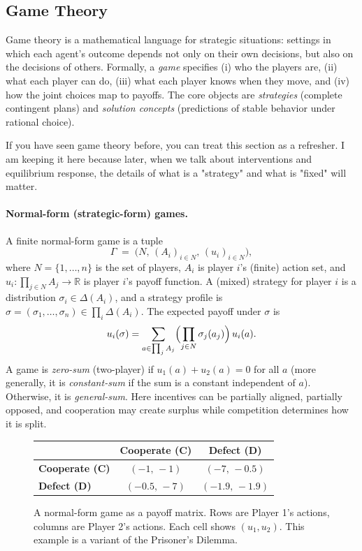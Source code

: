 \documentclass{article}
\begin{document}
\subsection{Game Theory}
Game theory is a mathematical language for strategic situations: settings in which each agent’s outcome depends not only on their own decisions, but also on the decisions of others. Formally, a \emph{game} specifies (i) who the players are, (ii) what each player can do, (iii) what each player knows when they move, and (iv) how the joint choices map to payoffs. The core objects are \emph{strategies} (complete contingent plans) and \emph{solution concepts} (predictions of stable behavior under rational choice).

If you have seen game theory before, you can treat this section as a refresher. I am keeping it here because later, when we talk about interventions and equilibrium response, the details of what is a "strategy" and what is "fixed" will matter.

\paragraph{Normal-form (strategic-form) games.}
A finite normal-form game is a tuple
\[
\Gamma \;=\; \bigl(N,\,(A_i)_{i\in N},\,(u_i)_{i\in N}\bigr),
\]
where \(N=\{1,\dots,n\}\) is the set of players, \(A_i\) is player \(i\)’s (finite) action set, and \(u_i:\prod_{j\in N} A_j \to \mathbb{R}\) is player \(i\)’s payoff function. A (mixed) strategy for player \(i\) is a distribution \(\sigma_i \in \Delta(A_i)\), and a strategy profile is \(\sigma=(\sigma_1,\dots,\sigma_n)\in \prod_i \Delta(A_i)\). The expected payoff under \(\sigma\) is
\[
u_i(\sigma) = \sum_{a\in \prod_j A_j}\Bigl(\prod_{j\in N}\sigma_j(a_j)\Bigr)\,u_i(a).
\]
A game is \emph{zero-sum} (two-player) if \(u_1(a) + u_2(a) = 0\) for all \(a\) (more generally, it is \emph{constant-sum} if the sum is a constant independent of \(a\)). Otherwise, it is \emph{general-sum}. Here incentives can be partially aligned, partially opposed, and cooperation may create surplus while competition determines how it is split.


\begin{figure}[htbp]
\centering
\setlength{\tabcolsep}{14pt}
\renewcommand{\arraystretch}{1.4}
\begin{tabular}{@{} l cc @{}}
\toprule
 & \textbf{Cooperate (C)} & \textbf{Defect (D)} \\
\midrule
\textbf{Cooperate (C)} & $(-1,\,-1)$ & $(-7,\,-0.5)$ \\
\textbf{Defect (D)} & $(-0.5,\,-7)$ & $(-1.9,\,-1.9)$ \\
\bottomrule
\end{tabular}
\caption{A normal-form game as a payoff matrix. Rows are Player 1's actions, columns are Player 2's actions. Each cell shows $(u_1, u_2)$. This example is a variant of the Prisoner's Dilemma.}
\label{fig:normal-form}
\end{figure}
\end{document}
